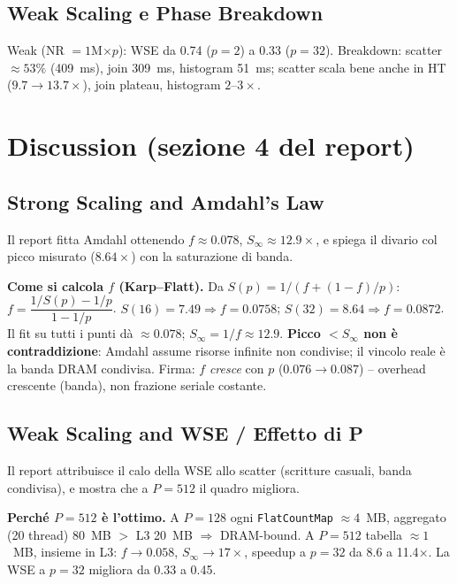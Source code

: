 \documentclass[11pt,a4paper]{article}
\begin{document}
\subsection{Weak Scaling e Phase Breakdown}

Weak (NR $=1$M$\times p$): WSE da 0.74 ($p{=}2$) a 0.33 ($p{=}32$). Breakdown: scatter $\approx53\%$ (409~ms), join 309~ms, histogram 51~ms; scatter scala bene anche in HT ($9.7\to13.7\times$), join plateau, histogram $2$--$3\times$.

\section{Discussion (sezione 4 del report)}

\subsection{Strong Scaling and Amdahl's Law}

Il report fitta Amdahl ottenendo $f\approx0.078$, $S_\infty\approx12.9\times$, e spiega il divario col picco misurato ($8.64\times$) con la saturazione di banda.

\begin{deriv}
\textbf{Come si calcola $f$ (Karp--Flatt).} Da $S(p)=1/(f+(1-f)/p)$: $f=\dfrac{1/S(p)-1/p}{1-1/p}$. $S(16)=7.49\Rightarrow f=0.0758$; $S(32)=8.64\Rightarrow f=0.0872$. Il fit su tutti i punti dà $\approx0.078$; $S_\infty=1/f\approx12.9$. \textbf{Picco $<S_\infty$ non è contraddizione}: Amdahl assume risorse infinite non condivise; il vincolo reale è la banda DRAM condivisa. Firma: $f$ \emph{cresce} con $p$ ($0.076\to0.087$) -- overhead crescente (banda), non frazione seriale costante.
\end{deriv}

\subsection{Weak Scaling and WSE / Effetto di P}

Il report attribuisce il calo della WSE allo scatter (scritture casuali, banda condivisa), e mostra che a $P=512$ il quadro migliora.

\begin{deriv}
\textbf{Perché $P=512$ è l'ottimo.} A $P=128$ ogni \texttt{FlatCountMap} $\approx4$~MB, aggregato (20 thread) 80~MB $>$ L3 20~MB $\Rightarrow$ DRAM-bound. A $P=512$ tabella $\approx1$~MB, insieme in L3: $f\to0.058$, $S_\infty\to17\times$, speedup a $p=32$ da 8.6 a 11.4$\times$. La WSE a $p=32$ migliora da 0.33 a 0.45.
\end{deriv}
\end{document}
